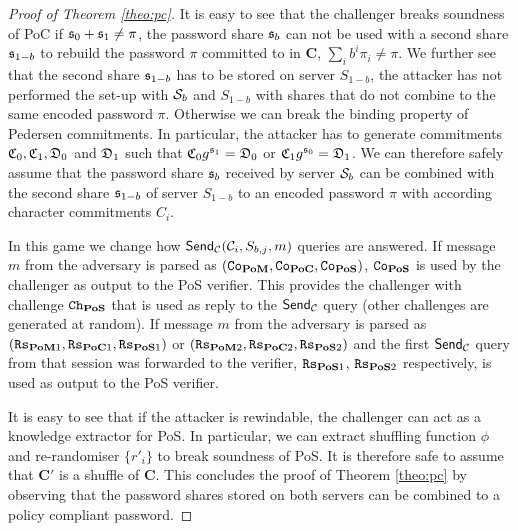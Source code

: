 \begin{proof}[Proof of Theorem \ref{theo:pc}]
It is easy to see that the challenger breaks soundness of \ac{PoC} if $\mathfrak{s}_0+\mathfrak{s}_1\not=\pi$, \ie the password share $\mathfrak{s}_b$ can not be used with a second share $\mathfrak{s}_{1-b}$ to rebuild the password $\pi$ committed to in $\bm C$, \ie $\sum_i b^i\pi_i\not=\pi$.
We further see that the second share $\mathfrak{s}_{1-b}$ has to be stored on server $S_{1-b}$, \ie the attacker has not performed the set-up with $\mathcal{S}_b$ and $S_{1-b}$ with shares that do not combine to the same encoded password $\pi$.
Otherwise we can break the binding property of Pedersen commitments.
In particular, the attacker has to generate commitments $\mathfrak{C}_0, \mathfrak{C}_1, \mathfrak{D}_0$ and $\mathfrak{D}_{1}$ such that $\mathfrak{C}_0g^{\mathfrak{s}_1}=\mathfrak{D}_0$ or $\mathfrak{C}_1g^{\mathfrak{s}_0}=\mathfrak{D}_1$.
We can therefore safely assume that the password share $\mathfrak{s}_b$ received by server $\mathcal{S}_b$ can be combined with the second share $\mathfrak{s}_{1-b}$ of server $S_{1-b}$ to an encoded password $\pi$ with according character commitments $C_i$.


In this game we change how $\mathsf{Send}_\mathcal{C}(\mathcal{C}_i, S_{b,j}, m)$ queries are answered.
If message $m$ from the adversary is parsed as $(\mathtt{Co}_\mathsf{\bf PoM},\mathtt{Co}_\mathsf{\bf PoC},\mathtt{Co}_\mathsf{\bf PoS})$, $\mathtt{Co}_\mathsf{\bf PoS}$ is used by the challenger as output to the \ac{PoS} verifier.
This provides the challenger with challenge $\mathtt{Ch}_\mathsf{\bf PoS}$ that is used as reply to the $\mathsf{Send}_\mathcal{C}$ query (other challenges are generated at random).
If message $m$ from the adversary is parsed as $(\mathtt{Rs}_{\mathsf{\bf PoM}1},\mathtt{Rs}_{\mathsf{\bf PoC}1},\mathtt{Rs}_{\mathsf{\bf PoS}1})$ or $(\mathtt{Rs}_{\mathsf{\bf PoM}2},\mathtt{Rs}_{\mathsf{\bf PoC}2},\mathtt{Rs}_{\mathsf{\bf PoS}2})$ and the first $\mathsf{Send}_\mathcal{C}$ query from that session was forwarded to the verifier, $\mathtt{Rs}_{\mathsf{\bf PoS}1}$, $\mathtt{Rs}_{\mathsf{\bf PoS}2}$ respectively, is used as output to the \ac{PoS} verifier.

It is easy to see that if the attacker is rewindable, the challenger can act as a knowledge extractor for \ac{PoS}.
In particular, we can extract shuffling function $\phi$ and re-randomiser $\{r'_i\}$ to break soundness of \ac{PoS}.
It is therefore safe to assume that $\bm C'$ is a shuffle of $\bm C$.
This concludes the proof of Theorem \ref{theo:pc} by observing that the password shares stored on both servers can be combined to a policy compliant password.
\end{proof}



